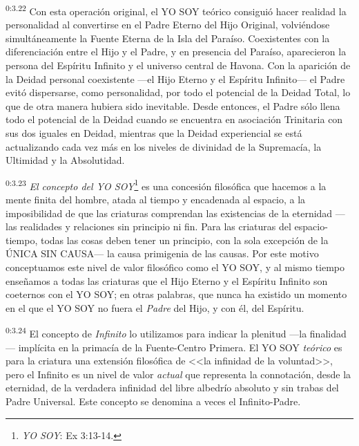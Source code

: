 \par
\textsuperscript{0:3.22} Con esta operación original, el YO SOY teórico consiguió hacer realidad la personalidad al convertirse en el Padre Eterno del Hijo Original, volviéndose simultáneamente la Fuente Eterna de la Isla del Paraíso. Coexistentes con la diferenciación entre el Hijo y el Padre, y en presencia del Paraíso, aparecieron la persona del Espíritu Infinito y el universo central de Havona. Con la aparición de la Deidad personal coexistente ---el Hijo Eterno y el Espíritu Infinito--- el Padre evitó dispersarse, como personalidad, por todo el potencial de la Deidad Total, lo que de otra manera hubiera sido inevitable. Desde entonces, el Padre sólo llena todo el potencial de la Deidad cuando se encuentra en asociación Trinitaria con sus dos iguales en Deidad, mientras que la Deidad experiencial se está actualizando cada vez más en los niveles de divinidad de la Supremacía, la Ultimidad y la Absolutidad.

\par
\textsuperscript{0:3.23} \textit{El concepto del YO SOY}\footnote{\textit{YO SOY}: Ex 3:13-14.} es una concesión filosófica que hacemos a la mente finita del hombre, atada al tiempo y encadenada al espacio, a la imposibilidad de que las criaturas comprendan las existencias de la eternidad ---las realidades y relaciones sin principio ni fin. Para las criaturas del espacio-tiempo, todas las cosas deben tener un principio, con la sola excepción de la ÚNICA SIN CAUSA--- la causa primigenia de las causas. Por este motivo conceptuamos este nivel de valor filosófico como el YO SOY, y al mismo tiempo enseñamos a todas las criaturas que el Hijo Eterno y el Espíritu Infinito son coeternos con el YO SOY; en otras palabras, que nunca ha existido un momento en el que el YO SOY no fuera el \textit{Padre} del Hijo, y con él, del Espíritu.

\par
\textsuperscript{0:3.24} El concepto de \textit{Infinito} lo utilizamos para indicar la plenitud ---la finalidad--- implícita en la primacía de la Fuente-Centro Primera. El YO SOY \textit{teórico} es para la criatura una extensión filosófica de <<la infinidad de la voluntad>>, pero el Infinito es un nivel de valor \textit{actual} que representa la connotación, desde la eternidad, de la verdadera infinidad del libre albedrío absoluto y sin trabas del Padre Universal. Este concepto se denomina a veces el Infinito-Padre.

